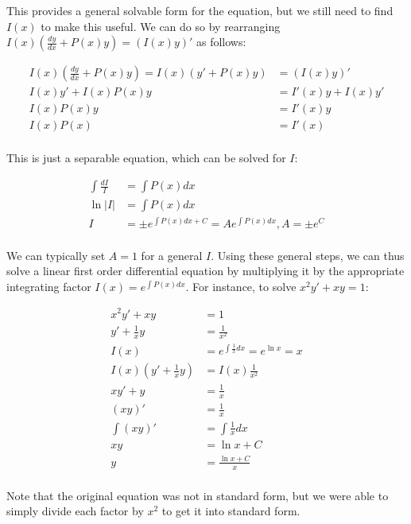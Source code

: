 \documentclass[12pt]{article}
\begin{document}
This provides a general solvable form for the equation, but we still need to find $I(x)$ to make this useful. We can do so by rearranging $I(x)(\frac{dy}{dx} + P(x)y) = (I(x)y)'$ as follows:

\begin{equation}
    \begin{split}
    I(x)(\frac{dy}{dx} + P(x)y) = I(x)(y'+P(x)y) &= (I(x)y)'\\
    I(x)y' + I(x)P(x)y &= I'(x)y+I(x)y'\\
    I(x)P(x)y &= I'(x)y\\
    I(x)P(x) &= I'(x)\\
    \end{split}
\end{equation}

This is just a separable equation, which can be solved for $I$:

\begin{equation}
    \begin{split}
        \int \frac{dI}{I} &= \int P(x) dx\\
        \ln |I| &= \int P(x) dx \\
        I  &= \pm e^{\int P(x) dx + C} = Ae^{\int P(x) dx}, A=\pm e^{C}\\
    \end{split}
\end{equation}

We can typically set $A=1$ for a general $I$. Using these general steps, we can thus solve a linear first order differential equation by multiplying it by the appropriate integrating factor $I(x) = e^{\int P(x) dx}$. For instance, to solve $x^2y'+xy=1$:

\begin{equation}
    \begin{split}
        x^2y'+xy &= 1\\
        y' + \frac{1}{x}y &= \frac{1}{x^2}\\
        I(x) &= e^{\int \frac{1}{x} dx} = e^{\ln x} = x\\
        I(x)(y' + \frac{1}{x}y) &= I(x)\frac{1}{x^2}\\
        xy'+y &= \frac{1}{x}\\
        (xy)' &= \frac{1}{x}\\
        \int (xy)' &= \int \frac{1}{x} dx\\
        xy &= \ln x + C\\
        y &= \frac{\ln x + C}{x}\\
    \end{split}
\end{equation}

Note that the original equation was not in standard form, but we were able to simply divide each factor by $x^2$ to get it into standard form.
\end{document}
